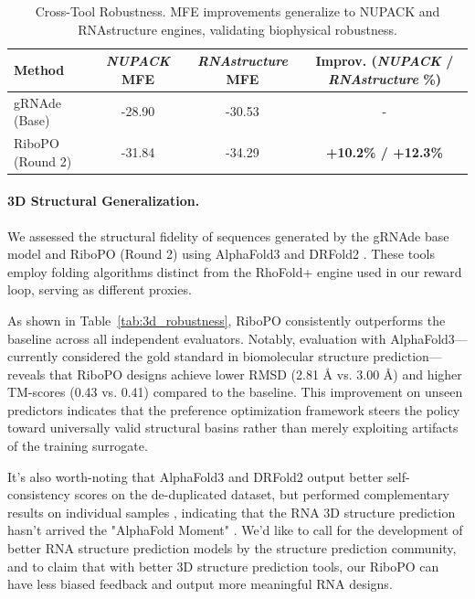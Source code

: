 {{\begin{table}[htbp]
\centering
\caption{Cross-Tool Robustness. MFE improvements generalize to NUPACK and RNAstructure engines, validating biophysical robustness.}
\label{tab:crosstool}
\begin{tabular}{lccc}
\toprule
\textbf{Method} & \textbf{\textit{NUPACK} MFE} & \textbf{\textit{RNAstructure} MFE} & \textbf{Improv. (\small{\textit{NUPACK} / \textit{RNAstructure}} \%)} \\
\midrule
gRNAde (Base)   & -28.90 & -30.53 & - \\
RiboPO (Round 2) & -31.84 & -34.29 & \textbf{+10.2\% / +12.3\%} \\
\bottomrule
\end{tabular}
\end{table}



\paragraph{3D Structural Generalization.}
We assessed the structural fidelity of sequences generated by the gRNAde base model and RiboPO (Round 2) using AlphaFold3 \citep{abramson2024accurate} and DRFold2 \citep{li2025drfold2}. These tools employ folding algorithms distinct from the RhoFold+ engine used in our reward loop, serving as different proxies. 

As shown in Table~\ref{tab:3d_robustness}, RiboPO consistently outperforms the baseline across all independent evaluators. Notably, evaluation with AlphaFold3—currently considered the gold standard in biomolecular structure prediction—reveals that RiboPO designs achieve lower RMSD (2.81 \AA{} vs. 3.00 \AA{}) and higher TM-scores (0.43 vs. 0.41) compared to the baseline. This improvement on unseen predictors indicates that the preference optimization framework steers the policy toward universally valid structural basins rather than merely exploiting artifacts of the training surrogate.

It's also worth-noting that AlphaFold3 and DRFold2 output better self-consistency scores on the de-duplicated dataset, but performed complementary results on individual samples \citep{Martin2024review}, indicating that the RNA 3D structure prediction hasn't arrived the "AlphaFold Moment" \citep{li2025drfold2}. We'd like to call for the development of better RNA structure prediction models by the structure prediction community, and to claim that with better 3D structure prediction tools, our RiboPO can have less biased feedback and output more meaningful RNA designs.

}}
